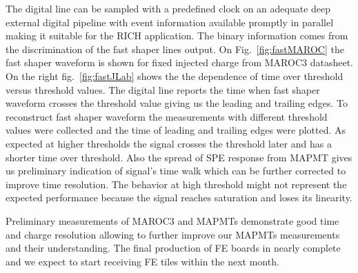 The digital line can be sampled with a predefined clock on an adequate deep external digital pipeline with event information available promptly in parallel making it suitable for the RICH application.
The binary information comes from the discrimination of the fast shaper lines output.
On Fig.~\ref{fig:fastMAROC} the fast shaper waveform is shown for fixed injected charge from MAROC3 datasheet.
On the right fig.~\ref{fig:fastJLab} shows the the dependence of time over threshold versus threshold values.
The digital line reports the time when fast shaper waveform crosses the threshold value giving us the leading and trailing edges.
To reconstruct fast shaper waveform the measurements with different threshold values were collected and the time of leading and trailing edges were plotted.
As expected at higher thresholds the signal crosses the threshold later and has a shorter time over threshold.
Also the spread of SPE response from MAPMT gives us preliminary indication of signal's time walk which can be further corrected to improve time resolution.
The behavior at high threshold might not represent the expected performance because the signal reaches saturation and loses its linearity.


Preliminary measurements of MAROC3 and MAPMTs demonstrate good time and charge resolution allowing to further improve our MAPMTs measurements and their understanding.
The final production of FE boards in nearly complete and we expect to start receiving FE tiles within the next month.
